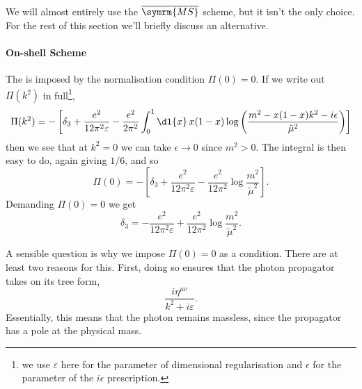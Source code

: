 \documentclass[fleqn]{NotesClass}
\newcommand{\MSbar}{\ensuremath{\overline{\symrm{MS}}}}
\newcommand{\minkowskiMetric}{\eta}
\begin{document}
    We will almost entirely use the \MSbar{} scheme, but it isn't the only choice.
    For the rest of this section we'll briefly discuss an alternative.
    
    \paragraph{On-shell Scheme}
    The  is imposed by the normalisation condition \(\Pi(0) = 0\).
    If we write out \(\Pi(k^2)\) in full\footnote{we use \(\varepsilon\) here for the parameter of dimensional regularisation and \(\epsilon\) for the parameter of the \(i\epsilon\) prescription.},
    \begin{equation}
        \Pi(k^2) = -\left[ \delta_3 + \frac{e^2}{12\pi^2\varepsilon} - \frac{e^2}{2\pi^2} \int_0^1 \dl{x} \, x(1 - x) \log\left( \frac{m^2 - x(1 - x)k^2 - i\epsilon}{\tilde{\mu}^2} \right) \right]
    \end{equation}
    then we see that at \(k^2 = 0\) we can take \(\epsilon \to 0\) since \(m^2 > 0\).
    The integral is then easy to do, again giving \(1/6\), and so
    \begin{equation}
        \Pi(0) = -\left[ \delta_3 + \frac{e^2}{12\pi^2\varepsilon} - \frac{e^2}{12\pi^2} \log \frac{m^2}{\tilde{\mu}^2} \right].
    \end{equation}
    Demanding \(\Pi(0) = 0\) we get
    \begin{equation}
        \delta_3 = -\frac{e^2}{12\pi^2\varepsilon} + \frac{e^2}{12\pi^2} \log \frac{m^2}{\tilde{\mu}^2}.
    \end{equation}
    
    A sensible question is why we impose \(\Pi(0) = 0\) as a condition.
    There are at least two reasons for this.
    First, doing so ensures that the photon propagator takes on its tree form,
    \begin{equation}
        \frac{i\minkowskiMetric^{\mu\nu}}{k^2 + i\varepsilon}.
    \end{equation}
    Essentially, this means that the photon remains massless, since the propagator has a pole at the physical mass.
    
\end{document}
